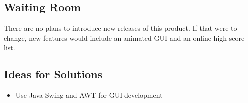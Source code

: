 \documentclass[12pt]{article}
\begin{document}
\subsection{Waiting Room}
There are no plans to introduce new releases of this product. If that were to change, new features would include an animated GUI and an online high score list.

\subsection{Ideas for Solutions}
\begin{itemize}
	\item Use Java Swing and AWT for GUI development
\end{itemize}
\end{document}
